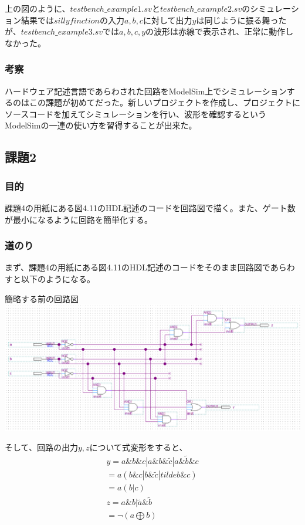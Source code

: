 \documentclass[a4paper]{jarticle}
\begin{document}
上の図のように、$testbench\_example1.sv$と$testbench\_example2.sv$のシミュレーション結果では$sillyfinction$の入力$a,b,c$に対して出力$y$は同じように振る舞ったが、$testbench\_example3.sv$では$a,b,c,y$の波形は赤線で表示され、正常に動作しなかった。
\subsubsection{考察}
ハードウェア記述言語であらわされた回路をModelSim上でシミュレーションするのはこの課題が初めてだった。新しいプロジェクトを作成し、プロジェクトにソースコードを加えてシミュレーションを行い、波形を確認するというModelSimの一連の使い方を習得することが出来た。
\subsection{課題2}
\subsubsection{目的}
課題4の用紙にある図4.11のHDL記述のコードを回路図で描く。また、ゲート数が最小になるように回路を簡単化する。
\subsubsection{道のり}
まず、課題4の用紙にある図4.11のHDL記述のコードをそのまま回路図であらわすと以下のようになる。
\begin{center}
	簡略する前の回路図
	\includegraphics[width=15cm]{2-l-1.PNG}
\end{center}
そして、回路の出力$y,z$について式変形をすると、
\begin{eqnarray}
	y = a\&b\&c | a\&b\& \tilde{c} | a\&\tilde{b}\&c \nonumber \\
	  = a \left( b\&c | b\&\tilde{c} | tilde{b}\&c \right) \nonumber \\
	  = a \left( b | c \right) \nonumber \\
	z = a \& b | \tilde{a} \& \tilde{b} \nonumber \\
	  = \lnot \left( a \bigoplus b \right) \nonumber \\
\end{eqnarray}
\end{document}

